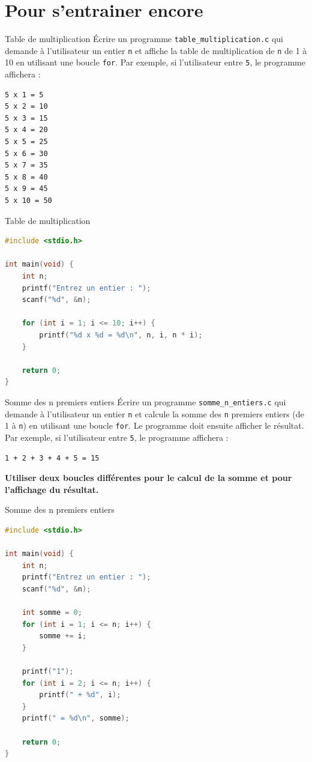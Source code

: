 \section{Pour s'entrainer encore}
\begin{UPSTIexercice}{Table de multiplication}
	\UPSTIetape Écrire un programme \texttt{table\_multiplication.c} qui demande à l'utilisateur un entier \texttt{n} et affiche la table de multiplication de \texttt{n} de 1 à 10 en utilisant une boucle \texttt{for}.
	Par exemple, si l'utilisateur entre \texttt{5}, le programme affichera :
	\begin{lstlisting}[language=bash,style=console]
5 x 1 = 5
5 x 2 = 10
5 x 3 = 15
5 x 4 = 20
5 x 5 = 25
5 x 6 = 30
5 x 7 = 35
5 x 8 = 40
5 x 9 = 45
5 x 10 = 50
\end{lstlisting}
\end{UPSTIexercice}

\begin{UPSTIcorrectionP}{Table de multiplication}
	\begin{lstlisting}[language=c]
#include <stdio.h>

int main(void) {
    int n;
    printf("Entrez un entier : ");
    scanf("%d", &n);

    for (int i = 1; i <= 10; i++) {
        printf("%d x %d = %d\n", n, i, n * i);
    }

    return 0;
}
	\end{lstlisting}
\end{UPSTIcorrectionP}

\begin{UPSTIexercice}{Somme des n premiers entiers}
	\UPSTIetape Écrire un programme \texttt{somme\_n\_entiers.c} qui demande à l'utilisateur un entier \texttt{n} et calcule la somme des \texttt{n} premiers entiers (de 1 à \texttt{n}) en utilisant une boucle \texttt{for}. Le programme doit ensuite afficher le résultat.
	Par exemple, si l'utilisateur entre \texttt{5}, le programme affichera :
	\begin{lstlisting}[language=bash,style=console]
1 + 2 + 3 + 4 + 5 = 15
\end{lstlisting}
	\textbf{Utiliser deux boucles différentes pour le calcul de la somme et pour l'affichage du résultat.}
\end{UPSTIexercice}

\begin{UPSTIcorrectionP}{Somme des n premiers entiers}
	\begin{lstlisting}[language=c]
#include <stdio.h>

int main(void) {
    int n;
    printf("Entrez un entier : ");
    scanf("%d", &n);

    int somme = 0;
    for (int i = 1; i <= n; i++) {
        somme += i;
    }

    printf("1");
    for (int i = 2; i <= n; i++) {
        printf(" + %d", i);
    }
    printf(" = %d\n", somme);

    return 0;
}
	\end{lstlisting}
\end{UPSTIcorrectionP}

